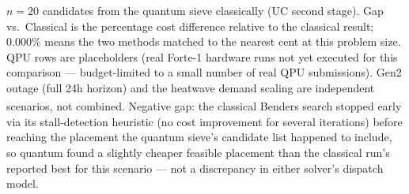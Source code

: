 \begin{table}[htbp]
{$n=20$ candidates from the quantum sieve classically (UC second stage). Gap
vs.\ Classical is the percentage cost difference relative to the classical
result; 0.000\% means the two methods matched to the nearest cent at this
problem size. QPU rows are placeholders (real Forte-1 hardware runs not yet
executed for this comparison --- budget-limited to a small number of real
QPU submissions). Gen2 outage (full 24h horizon) and the heatwave demand
scaling are independent scenarios, not combined. \textsuperscript{\dag}Negative
gap: the classical Benders search stopped early via its stall-detection
heuristic (no cost improvement for several iterations) before reaching the
placement the quantum sieve's candidate list happened to include, so quantum
found a slightly cheaper feasible placement than the classical run's
reported best for this scenario --- not a discrepancy in either solver's
dispatch model.}
\end{table}
